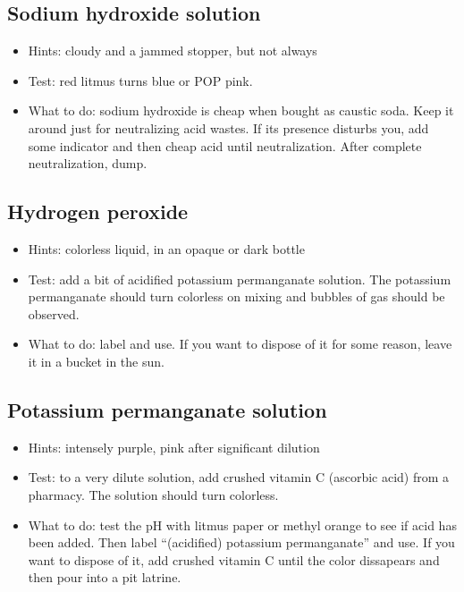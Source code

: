 \begin{itemize}
{\subsection{Sodium hydroxide solution}
\begin{itemize}
\item{Hints: cloudy and a jammed stopper, 
but not always}
\item{Test: red litmus turns blue or POP pink.}
\item{What to do: sodium hydroxide is cheap when bought as caustic soda. 
Keep it around just for neutralizing acid wastes. 
If its presence disturbs you, 
add some indicator and then cheap acid until neutralization. 
After complete neutralization, 
dump.}
\end{itemize}

\subsection{Hydrogen peroxide}
\begin{itemize}
\item{Hints: colorless liquid, 
in an opaque or dark bottle}
\item{Test: add a bit of acidified potassium permanganate solution. 
The potassium permanganate should turn colorless 
on mixing and bubbles of gas should be observed.}
\item{What to do: label and use. 
If you want to dispose of it for some reason, 
leave it in a bucket in the sun.}
\end{itemize}

\subsection{Potassium permanganate solution}
\begin{itemize}
\item{Hints: intensely purple, 
pink after significant dilution}
\item{Test: to a very dilute solution, 
add crushed vitamin C (ascorbic acid) from a pharmacy. 
The solution should turn colorless.}
\item{What to do: test the pH with litmus paper 
or methyl orange to see if acid has been added. 
Then label “(acidified) potassium permanganate” and use. 
If you want to dispose of it, 
add crushed vitamin C until the color dissapears 
and then pour into a pit latrine.}
\end{itemize}

}
\end{itemize}
